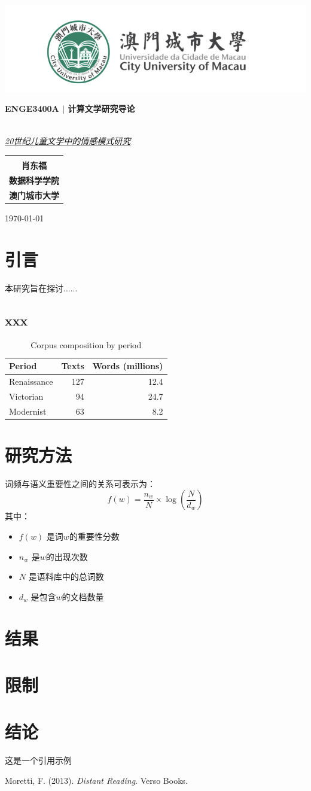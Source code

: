 \documentclass[10pt, twoside]{article}
\newcommand{\makecover}{
    \thispagestyle{empty}
    \begin{center}
        \vspace{0.3cm}
        \includegraphics[width=1\textwidth]{cityu.png}
        \vspace{1.1cm}
        
        {\fontsize{22}{25}\selectfont\bfseries ENGE3400A $|$ 计算文学研究导论}
        
        \vspace{2cm}
       
        {\fontsize{20}{19}\selectfont{\textbf{研究手册}}}\\[0.9cm]
        
        \vspace{1.8cm}
        {\fontsize{22}{25}\selectfont\underline{{\textit{20世纪儿童文学中的情感模式研究}}}}
        
        \vspace{4cm}
        {
        \fontsize{16}{19}\selectfont
        \begin{tabular}{c}
            \hline \\[-1.2ex]
            \textbf{\Large 肖东福} \\ 
            \textbf{数据科学学院} \\
            \textbf{\Large 澳门城市大学} \\ 
            \hline 
        \end{tabular}
        }
        \vspace{1.5cm}
        
        {\large{\today}}
    \end{center}
    \clearpage
}
\begin{document}
\makecover

\tableofcontents
\newpage

\section{引言} 
本研究旨在探讨......
\subsection{xxx} %
\begin{table}[H] %
\caption{Corpus composition by period}
\label{tab:corpus}
\centering %
\begin{tabular}{lrr}
\toprule
\textbf{Period} & \textbf{Texts} & \textbf{Words (millions)} \\
\midrule
Renaissance & 127 & 12.4 \\
Victorian & 94 & 24.7 \\
Modernist & 63 & 8.2 \\
\bottomrule
\end{tabular}
\end{table}
\section{研究方法}
词频与语义重要性之间的关系可表示为：
\[
f(w) = \frac{n_w}{N} \times \log\left(\frac{N}{d_w}\right)
\]
其中：
\begin{itemize}
    \item $f(w)$ 是词$w$的重要性分数
    \item $n_w$ 是$w$的出现次数
    \item $N$ 是语料库中的总词数
    \item $d_w$ 是包含$w$的文档数量
\end{itemize}


\section{结果}

\section{限制}

\section{结论}
这是一个引用示例\cite{moretti}

\begin{thebibliography}{9}
Moretti, F. (2013). \textit{Distant Reading}. Verso Books.
\end{thebibliography}
\end{document}
